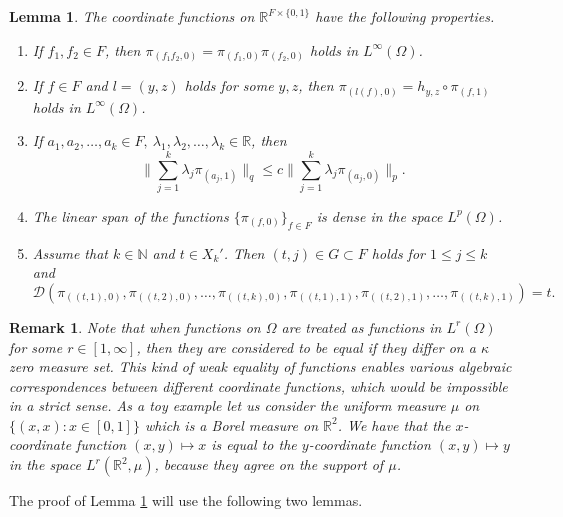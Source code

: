 \documentclass[a4wider]{amsart}
\newtheorem{lemma}[theorem]{Lemma}
\newtheorem{remarka}[theorem]{Remark}
\theoremstyle{definitionbreak}\newtheorem{D}[theorem]{Definition}
\theoremstyle{definitionbreak}\newtheorem*{D*}{Definition}
\begin{document}
\begin{lemma}\label{limconstlem1} The coordinate functions on $\mathbb{R}^{F\times\{0,1\}}$ have the following properties.
\begin{enumerate}
\item If $f_1,f_2\in F$, then $\pi_{(f_1f_2,0)}=\pi_{(f_1,0)}\pi_{(f_2,0)}$ holds in $L^{\infty}(\Omega)$.
\item If $f\in F$ and $l=(y,z)$ holds for some $y,z$, then $\pi_{(l(f),0)}=h_{y,z}\circ\pi_{(f,1)}$ holds in $L^{\infty}(\Omega)$.
\item If $a_1,a_2,\dots,a_k\in F,~\lambda_1,\lambda_2,\dots,\lambda_k\in\mathbb{R}$, then $$\Big\|\sum_{j=1}^k \lambda_j \pi_{(a_j,1)}\Big\|_q\leq c\Big\|\sum_{j=1}^k \lambda_j \pi_{(a_j,0)}\Big\|_p .$$
\item The linear span of the functions $\{\pi_{(f,0)}\}_{f\in F}$ is dense in the space $L^p(\Omega)$.

\item Assume that $k\in\mathbb{N}$ and $t\in X_k'$. Then $(t,j)\in G\subset F$ holds for $1\leq j\leq k$ and
$$\mathcal{D}(\pi_{((t,1),0)},\pi_{((t,2),0)},\dots,\pi_{((t,k),0)},\pi_{((t,1),1)},\pi_{((t,2),1)},\dots,\pi_{((t,k),1)})=t.$$

\end{enumerate}
\end{lemma}

\begin{remarka} Note that when functions on $\Omega$ are treated as functions in $L^r(\Omega)$ for some $r\in [1,\infty]$, then they are considered to be equal if they differ on a $\kappa$ zero measure set. This kind of weak equality of functions enables various algebraic correspondences between different coordinate functions, which would be impossible in a strict sense. As a toy example let us consider the uniform measure $\mu$ on $\{(x,x):x\in [0,1]\}$ which is a Borel measure on $\mathbb{R}^2$. We have that the $x$-coordinate function $(x,y)\mapsto x$ is equal to the $y$-coordinate function $(x,y)\mapsto y$ in the space $L^r(\mathbb{R}^2,\mu)$, because they agree on the support of $\mu$.
\end{remarka}

The proof of Lemma \ref{limconstlem1} will use the following two lemmas.
\end{document}
